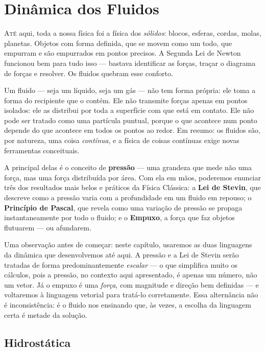 

\chapter{Dinâmica dos Fluidos}

\lettrine{A}{té} aqui, toda a nossa física foi a física dos \textit{sólidos}: blocos, esferas,
cordas, molas, planetas. Objetos com forma definida, que se movem como um todo, que
empurram e são empurrados em pontos precisos. A Segunda Lei de Newton funcionou bem
para tudo isso --- bastava identificar as forças, traçar o diagrama de forças
e resolver. Os fluidos quebram esse conforto.
 
Um fluido --- seja um líquido, seja um gás --- não tem forma própria: ele toma a
forma do recipiente que o contém. Ele não transmite forças apenas em pontos isolados:
ele as distribui por toda a superfície com que está em contato. Ele não pode ser
tratado como uma partícula puntual, porque o que acontece num ponto depende do que
acontece em todos os pontos ao redor. Em resumo: os fluidos são, por natureza, uma
coisa \textit{contínua}, e a física de coisas contínuas exige novas ferramentas
conceituais.
 
A principal delas é o conceito de \textbf{pressão} --- uma grandeza que mede não
uma força, mas uma força distribuída por área. Com ela em mãos, poderemos enunciar
três dos resultados mais belos e práticos da Física Clássica: a \textbf{Lei de
Stevin}, que descreve como a pressão varia com a profundidade em um fluido em
repouso; o \textbf{Princípio de Pascal}, que revela como uma variação de pressão se
propaga instantaneamente por todo o fluido; e o \textbf{Empuxo}, a força que faz
objetos flutuarem --- ou afundarem.
 
Uma observação antes de começar: neste capítulo, usaremos as duas linguagens da
dinâmica que desenvolvemos até aqui. A pressão e a Lei de Stevin serão tratadas de
forma predominantemente \textit{escalar} --- o que simplifica muito os cálculos, pois
a pressão, no contexto aqui apresentado, é apenas um número, não um vetor. Já o empuxo é uma \textit{força}, com magnitude
e direção bem definidas --- e voltaremos à linguagem vetorial para tratá-lo
corretamente. Essa alternância não é inconsistência: é o fluido nos ensinando que,
às vezes, a escolha da linguagem certa é metade da solução.

\section{Hidrostática}

